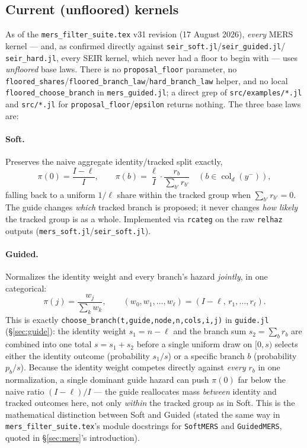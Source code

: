 \documentclass[11pt]{article}
\newcommand{\col}{\operatorname{col}}
\theoremstyle{plain}
\begin{document}
\subsection{Current (unfloored) kernels}
\label{sec:unfloored}

As of the \texttt{mers\_filter\_suite.tex} v31 revision (17 August 2026), \emph{every} MERS kernel
--- and, as confirmed directly against \texttt{seir\_soft.jl}/\texttt{seir\_guided.jl}/
\texttt{seir\_hard.jl}, every SEIR kernel, which never had a floor to begin with --- uses
\emph{unfloored} base laws. There is no \texttt{proposal\_floor} parameter, no
\texttt{floored\_shares}/\texttt{floored\_branch\_law}/\texttt{hard\_branch\_law} helper, and no
local \texttt{floored\_choose\_branch} in \texttt{mers\_guided.jl}; a direct grep of
\texttt{src/examples/*.jl} and \texttt{src/*.jl} for \texttt{proposal\_floor}/\texttt{epsilon}
returns nothing. The three base laws are:

\paragraph{Soft.} Preserves the naive aggregate identity/tracked split exactly,
\[
\pi(0) = \frac{I-\ell}{I}, \qquad \pi(b) = \frac{\ell}{I}\cdot\frac{r_b}{\sum_{b'}r_{b'}}
\quad (b\in\col_d(y^-)),
\]
falling back to a uniform $1/\ell$ share within the tracked group when $\sum_{b'}r_{b'}=0$. The
guide changes \emph{which} tracked branch is proposed; it never changes \emph{how likely} the
tracked group is as a whole. Implemented via \texttt{rcateg} on the raw \texttt{relhaz} outputs
(\texttt{mers\_soft.jl}/\texttt{seir\_soft.jl}).

\paragraph{Guided.} Normalizes the identity weight and every branch's hazard \emph{jointly}, in one
categorical:
\[
\pi(j) = \frac{w_j}{\sum_k w_k}, \qquad (w_0,w_1,\ldots,w_\ell) = (I-\ell,\,r_1,\ldots,r_\ell).
\]
This is exactly \texttt{choose\_branch(t,guide,node,n,cols,i,j)} in \texttt{guide.jl}
(\S\ref{sec:guide}): the identity weight $s_1=n-\ell$ and the branch sum $s_2=\sum_b r_b$ are
combined into one total $s=s_1+s_2$ before a single uniform draw on $[0,s)$ selects either the
identity outcome (probability $s_1/s$) or a specific branch $b$ (probability $p_b/s$). Because the
identity weight competes directly against \emph{every} $r_b$ in one normalization, a single
dominant guide hazard can push $\pi(0)$ far below the naive ratio $(I-\ell)/I$ --- the guide
reallocates mass \emph{between} identity and tracked outcomes here, not only \emph{within} the
tracked group as in Soft. This is the mathematical distinction between Soft and Guided (stated the
same way in \texttt{mers\_filter\_suite.tex}'s module docstrings for \texttt{SoftMERS} and
\texttt{GuidedMERS}, quoted in \S\ref{sec:mers}'s introduction).
\end{document}
